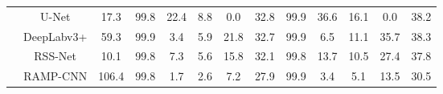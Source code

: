 \begin{table}[hbt!]
{\begin{tabular}{ccccccccccccc}
                                 & U-Net                                    & 17.3                                                                                          & 99.8                    & {\color[HTML]{FFC702} 22.4} & {\color[HTML]{009901} 8.8}                          & \multicolumn{1}{c|}{0.0}                                                 & \multicolumn{1}{c|}{32.8}                                                & 99.9                    & {\color[HTML]{FFC702} 36.6}                         & {\color[HTML]{009901} 16.1} & \multicolumn{1}{c|}{0.0}                         & 38.2                        \\
                                 & DeepLabv3+                               & 59.3                                                                                          & 99.9                    & 3.4                         & 5.9                                                 & \multicolumn{1}{c|}{21.8}                                                & \multicolumn{1}{c|}{32.7}                                                & 99.9                    & 6.5                                                 & 11.1                        & \multicolumn{1}{c|}{35.7}                        & 38.3                        \\
                                 & RSS-Net                                  & 10.1                                                                                          & 99.8                    & 7.3                         & 5.6                                                 & \multicolumn{1}{c|}{15.8}                                                & \multicolumn{1}{c|}{32.1}                                                & 99.8                    & 13.7                                                & 10.5                        & \multicolumn{1}{c|}{27.4}                        & 37.8                        \\
                                 & RAMP-CNN                                 & 106.4                                                                                         & 99.8                    & 1.7                         & 2.6                                                 & \multicolumn{1}{c|}{7.2}                                                 & \multicolumn{1}{c|}{27.9}                                                & 99.9                    & 3.4                                                 & 5.1                         & \multicolumn{1}{c|}{13.5}                        & 30.5                        \\

\end{tabular}}
\end{table}
